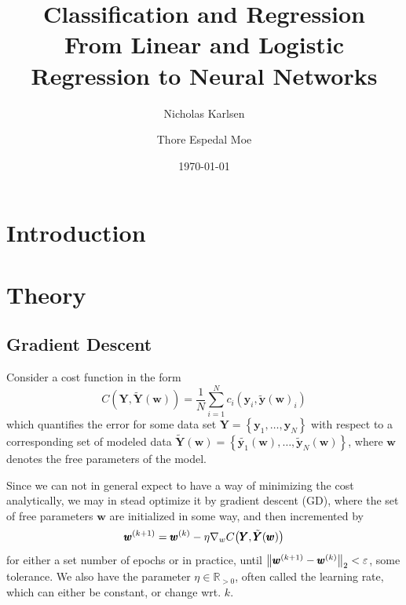 \documentclass[reprint, english, nofootinbib]{revtex4-2}
\begin{document}
\title{Classification and Regression\\
\normalsize{From Linear and Logistic Regression to Neural Networks}}

\author{Nicholas Karlsen}
\author{Thore Espedal Moe}
\date{\today}

\begin{abstract}
\end{abstract}

\maketitle

\section{Introduction}

\section{Theory}
\subsection{Gradient Descent}
\noindent
Consider a cost function in the form
\begin{equation}
    C(\pmb Y, \tilde{\pmb Y}(\pmb w)) = \frac{1}{N}\sum_{i=1}^{N}c_i(\pmb y_i, \tilde{\pmb y}(\pmb w)_i)
\end{equation}
which quantifies the error for some data set $\pmb Y = \left\{\pmb y_1, \dots, \pmb y_N\right\}$ with respect to a corresponding set of modeled data $\tilde{\pmb Y}(\pmb w) = \left\{\tilde{\pmb y_1}(\pmb w), \dots, \tilde{\pmb y}_N(\pmb w)\right\}$, where $\pmb w$ denotes the free parameters of the model.

Since we can not in general expect to have a way of minimizing the cost analytically, we may in stead optimize it by gradient descent (GD), where the set of free parameters $\pmb w$ are initialized in some way, and then incremented by
\begin{equation}\label{eqn: GD}
    \pmb w^{(k+1)} = \pmb w^{(k)} - \eta \nabla_{w}C\qty(\pmb Y, \tilde{\pmb Y}(\pmb w))
\end{equation}
for either a set number of epochs or in practice, until $\norm{\pmb w^{(k+1)} - \pmb w^{(k)}}_2< \varepsilon$, some tolerance. We also have the parameter $\eta \in \mathbb R_{>0}$, often called the learning rate, which can either be constant, or change wrt. $k$.
\end{document}
